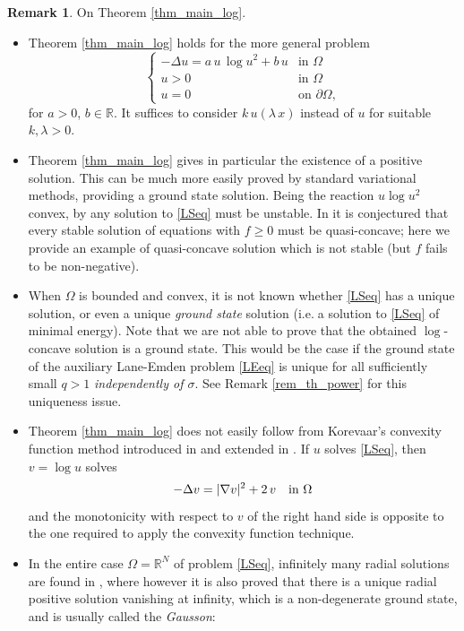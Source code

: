 \documentclass[12pt]{amsart}
\numberwithin{equation}{section}
\theoremstyle{plain}
\theoremstyle{plain}
\theoremstyle{plain}
\theoremstyle{definition}
\newtheorem{remark}[theorem]{Remark}
\newcommand{\R}{{\mathbb R}}
\begin{document}
\begin{remark}
\label{rem_Th_main_log}
On Theorem \ref{thm_main_log}. 
\begin{itemize}[leftmargin=*]
\item
Theorem \ref{thm_main_log} holds for the more general problem
\begin{equation}\label{eq_rescaled_gen}
\begin{cases}
-\Delta u=a\, u\, \log u^2 + b\, u& \text{in $\Omega$}\\
u>0&\text{in $\Omega$}\\
u=0&\text{on $\partial\Omega$},
\end{cases}
\end{equation}
for $a>0$, $b\in \R$. It suffices to consider $ k\, u(\lambda\, x)$ instead of $u$ for suitable $k, \lambda>0$. 
\item
Theorem \ref{thm_main_log} gives in particular the existence of a positive solution. 
This can be much more easily proved by standard variational methods, providing a ground state solution. 
Being the reaction $u \log u^2$ convex, by \cite{KaSi01} any solution to \eqref{LSeq} must be unstable. 
In \cite{CaCh98} it is conjectured that every stable solution of equations with $f\geq 0$ must be quasi-concave; here we provide an example of quasi-concave solution which is not stable (but $f$ fails to be non-negative).
\item
When $\Omega$ is bounded and convex, it is not known whether \eqref{LSeq} has a unique solution, or even a unique {\em ground state} solution (i.e.$\;$a solution to \eqref{LSeq} of minimal energy).
Note that we are not able to prove that the obtained $\log$-concave solution is a ground state. 
This would be the case if the ground state of the auxiliary Lane-Emden problem \eqref{LEeq} is unique for all sufficiently small $q>1$ {\em independently of $\sigma$}. 
See Remark \ref{rem_th_power} for this uniqueness issue. 
\item
Theorem \ref{thm_main_log} does not easily follow from Korevaar's convexity function method introduced in \cite{Kor83} and extended in \cite{Ken85, BMS22}. If $u$ solves \eqref{LSeq}, then $v=\log u$ solves 
$$-\Delta v= |\nabla v|^2 + 2\, v \quad \hbox{in $\Omega$}$$
and the monotonicity with respect to $v$ of the right hand side is opposite to the one required to apply the convexity function technique. 
\item
 In the entire case $\Omega=\R^N$ of problem \eqref{LSeq}, infinitely many radial solutions are found in \cite{DMS14}, where however it is also proved that there is a unique radial positive solution vanishing at infinity, which is a non-degenerate ground state, and is usually called the {\em Gausson}:

\end{itemize}
\end{remark}
\end{document}
